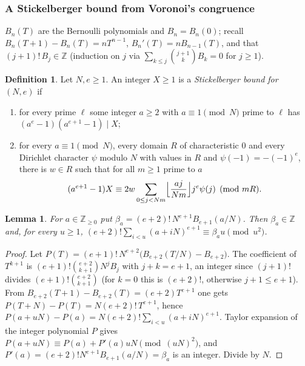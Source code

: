 \documentclass[10pt]{amsart}
\newtheorem{lemma}[theorem]{Lemma}
\theoremstyle{definition}
\newtheorem{definition}[theorem]{Definition}
\theoremstyle{remark}
\newcommand{\Z}{\mathbb Z}
\begin{document}
\subsubsection{A Stickelberger bound from Voronoi's congruence}\label{pod:ss-voronoi}

$B_n(T)$ are the Bernoulli polynomials and $B_n=B_n(0)$; recall $B_n(T+1)-B_n(T)=nT^{n-1}$,
$B_n'(T)=nB_{n-1}(T)$, and that $(j+1)!\,B_j\in\Z$ (induction on $j$ via $\sum_{k\le j}\binom{j+1}{k}
B_k=0$ for $j\ge1$).

\begin{definition}\label{pod:def-stick}
Let $N,e\ge1$. An integer $X\ge1$ is a \emph{Stickelberger bound for $(N,e)$} if
\begin{enumerate}
\item[(S1)] for every prime $\ell$ some integer $a\ge2$ with $a\equiv1\pmod N$ prime to $\ell$ has $(a^e-1)(a^{e+1}-1)\mid
X$;
\item[(S2)] for every $a\equiv1\pmod N$, every domain $R$ of characteristic $0$ and every Dirichlet
character $\psi$ modulo $N$ with values in $R$ and $\psi(-1)=-(-1)^e$, there is $w\in R$ such that
for all $m\ge1$ prime to $a$
\[
(a^{e+1}-1)X\equiv2w\sum_{0\le j<Nm}\Bigl\lfloor\frac{aj}{Nm}\Bigr\rfloor j^e\psi(j)\pmod{mR}.
\]
\end{enumerate}
\end{definition}

\begin{lemma}\label{pod:powersum}
For $a\in\Z_{\ge0}$ put $\beta_a=(e+2)!\,N^{e+1}B_{e+1}(a/N)$. Then $\beta_a\in\Z$ and, for every
$u\ge1$, $(e+2)!\sum_{i<u}(a+iN)^{e+1}\equiv\beta_au\pmod{u^2}$.
\end{lemma}
\begin{proof}
Let $P(T)=(e+1)!\,N^{e+2}\bigl(B_{e+2}(T/N)-B_{e+2}\bigr)$. The coefficient of $T^{k+1}$ is
$(e+1)!\binom{e+2}{k+1}N^jB_j$ with $j+k=e+1$, an integer since $(j+1)!$ divides $(e+1)!\binom{e+2}
{k+1}$ (for $k=0$ this is $(e+2)!$, otherwise $j+1\le e+1$). From $B_{e+2}(T+1)-B_{e+2}(T)=(e+2)T^{e+1}$
one gets $P(T+N)-P(T)=N(e+2)!\,T^{e+1}$, hence $P(a+uN)-P(a)=N(e+2)!\sum_{i<u}(a+iN)^{e+1}$. Taylor
expansion of the integer polynomial $P$ gives $P(a+uN)\equiv P(a)+P'(a)uN\pmod{(uN)^2}$, and
$P'(a)=(e+2)!N^{e+1}B_{e+1}(a/N)=\beta_a$ is an integer. Divide by $N$.
\end{proof}
\end{document}
